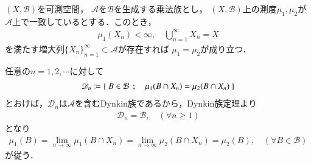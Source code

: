 		\begin{screen}
			\begin{thm}[測度の一致の定理]\label{thm:identity_theorem_of_measures}
				$(X,\mathcal{B})$を可測空間，
				$\mathcal{A}$を$\mathcal{B}$を生成する乗法族とし，
				$(X,\mathcal{B})$上の測度$\mu_1,\mu_2$が
				$\mathcal{A}$上で一致しているとする．このとき，
				\begin{align}
					\mu_1(X_n) < \infty,
					\quad \bigcup_{n=1}^\infty X_n = X
				\end{align}
				を満たす増大列$\{X_n\}_{n=1}^\infty \subset \mathcal{A}$が存在すれば
				$\mu_1 = \mu_2$が成り立つ．
			\end{thm}
		\end{screen}
		
		\begin{prf}
			任意の$n = 1,2,\cdots$に対して
			\begin{align}
				\mathscr{D}_n \coloneqq \left\{\ B \in \mathcal{B}\ \, ; \quad \mu_1(B \cap X_n) = \mu_2(B \cap X_n)\ \right\}
			\end{align}
			とおけば，$\mathscr{D}_n$は$\mathcal{A}$を含むDynkin族であるから，Dynkin族定理より
			\begin{align}
				\mathscr{D}_n = \mathcal{B},\quad (\forall n \geq 1)
			\end{align}
			となり
			\begin{align}
				\mu_1(B) = \lim_{n \to \infty} \mu_1(B \cap X_n)
				= \lim_{n \to \infty} \mu_2(B \cap X_n) = \mu_2(B),
				\quad (\forall B \in \mathcal{B})
			\end{align}
			が従う．
			\QED
		\end{prf}
		
